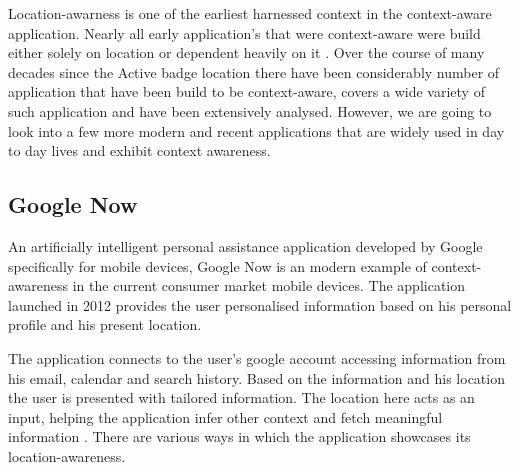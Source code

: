 \documentclass[12pt]{report}
\begin{document}
Location-awarness is one of the earliest harnessed context in the context-aware application. Nearly all early application's that were context-aware were build either solely on location or dependent heavily on it \cite{baldauf2007survey}. Over the course of many decades since the Active badge location \cite{want1992active} there have been considerably number of application that have been build to be context-aware, \cite{chen2000survey} covers a wide variety of such application and have been extensively analysed. However, we are going to look into a few more modern and recent applications that are widely used in day to day lives and exhibit context awareness. 

\subsection{Google Now}
An artificially intelligent personal assistance application developed by Google specifically for mobile devices, Google Now is an modern example of context-awareness in the current consumer market mobile devices. The application launched in 2012 provides the user personalised information based on his personal profile and his present location.

The application connects to the user's google account accessing information from his email, calendar and search history. Based on the information and his location the user is presented with tailored information. The location here acts as an input, helping the application infer other context and fetch meaningful information \cite{koubek2013augmented}. There are various ways in which the application showcases its location-awareness.
\end{document}
